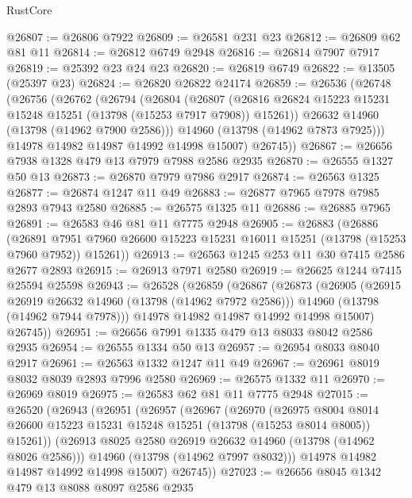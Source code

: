 \begin{lexlean}{RustCore}
\begin{coremodule}
@26807 := @26806 @7922
@26809 := @26581 @231 @23
@26812 := @26809 @62 @81 @11
@26814 := @26812 @6749 @2948
@26816 := @26814 @7907 @7917
@26819 := @25392 @23 @24 @23
@26820 := @26819 @6749
@26822 := @13505 (@25397 @23)
@26824 := @26820 @26822 @24174
@26859 := @26536
    (@26748
      (@26756
        (@26762
          (@26794
            (@26804
              (@26807
                (@26816 @26824 @15223 @15231 @15248 @15251 (@13798 (@15253 @7917 @7908)) @15261))
              @26632
              @14960
              (@13798 (@14962 @7900 @2586)))
            @14960
            (@13798 (@14962 @7873 @7925)))
          @14978
          @14982
          @14987
          @14992
          @14998
          @15007)
        @26745))
@26867 := @26656 @7938 @1328 @479 @13 @7979 @7988 @2586 @2935
@26870 := @26555 @1327 @50 @13
@26873 := @26870 @7979 @7986 @2917
@26874 := @26563 @1325
@26877 := @26874 @1247 @11 @49
@26883 := @26877 @7965 @7978 @7985 @2893 @7943 @2580
@26885 := @26575 @1325 @11
@26886 := @26885 @7965
@26891 := @26583 @46 @81 @11 @7775 @2948
@26905 := @26883
    (@26886
      (@26891 @7951 @7960 @26600 @15223 @15231 @16011 @15251 (@13798 (@15253 @7960 @7952)) @15261))
@26913 := @26563 @1245 @253 @11 @30 @7415 @2586 @2677 @2893
@26915 := @26913 @7971 @2580
@26919 := @26625 @1244 @7415 @25594 @25598
@26943 := @26528
    (@26859
      (@26867
        (@26873
          (@26905
            (@26915 @26919 @26632 @14960 (@13798 (@14962 @7972 @2586)))
            @14960
            (@13798 (@14962 @7944 @7978)))
          @14978
          @14982
          @14987
          @14992
          @14998
          @15007)
        @26745))
@26951 := @26656 @7991 @1335 @479 @13 @8033 @8042 @2586 @2935
@26954 := @26555 @1334 @50 @13
@26957 := @26954 @8033 @8040 @2917
@26961 := @26563 @1332 @1247 @11 @49
@26967 := @26961 @8019 @8032 @8039 @2893 @7996 @2580
@26969 := @26575 @1332 @11
@26970 := @26969 @8019
@26975 := @26583 @62 @81 @11 @7775 @2948
@27015 := @26520
    (@26943
      (@26951
        (@26957
          (@26967
            (@26970
              (@26975
                @8004
                @8014
                @26600
                @15223
                @15231
                @15248
                @15251
                (@13798 (@15253 @8014 @8005))
                @15261))
            (@26913 @8025 @2580 @26919 @26632 @14960 (@13798 (@14962 @8026 @2586)))
            @14960
            (@13798 (@14962 @7997 @8032)))
          @14978
          @14982
          @14987
          @14992
          @14998
          @15007)
        @26745))
@27023 := @26656 @8045 @1342 @479 @13 @8088 @8097 @2586 @2935

\end{coremodule}
\end{lexlean}
